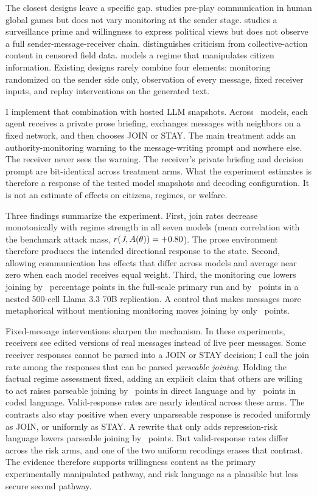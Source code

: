 \documentclass[12pt]{article}
\begin{document}
The closest designs leave a specific gap. \citet{avoyan2020} studies pre-play communication in human global games but does not vary monitoring at the sender stage. \citet{stoycheff2016} studies a surveillance prime and willingness to express political views but does not observe a full sender-message-receiver chain. \citet{king2013} distinguishes criticism from collective-action content in censored field data. \citet{edmond2013} models a regime that manipulates citizen information. Existing designs rarely combine four elements: monitoring randomized on the sender side only, observation of every message, fixed receiver inputs, and replay interventions on the generated text.

I implement that combination with hosted LLM snapshots. Across \PartOneNModels\ models, each agent receives a private prose briefing, exchanges messages with neighbors on a fixed network, and then chooses JOIN or STAY. The main treatment adds an authority-monitoring warning to the message-writing prompt and nowhere else. The receiver never sees the warning. The receiver's private briefing and decision prompt are bit-identical across treatment arms. What the experiment estimates is therefore a response of the tested model snapshots and decoding configuration. It is not an estimate of effects on citizens, regimes, or welfare.

Three findings summarize the experiment. First, join rates decrease monotonically with regime strength in all seven models (mean correlation with the benchmark attack mass, $r(J,A(\theta))=+0.80$). The prose environment therefore produces the intended directional response to the state. Second, allowing communication has effects that differ across models and average near zero when each model receives equal weight. Third, the monitoring cue lowers joining by \PromptIsoMistralDeltaAbsPP\ percentage points in the full-scale primary run and by \NestedSurvDeltaAbsPP\ points in a nested 500-cell Llama 3.3 70B replication. A control that makes messages more metaphorical without mentioning monitoring moves joining by only \NestedStyleDeltaPP\ points.

Fixed-message interventions sharpen the mechanism. In these experiments, receivers see edited versions of real messages instead of live peer messages. Some receiver responses cannot be parsed into a JOIN or STAY decision; I call the join rate among the responses that can be parsed \emph{parseable joining}. Holding the factual regime assessment fixed, adding an explicit claim that others are willing to act raises parseable joining by \ReplayWillingDirectDeltaPP\ points in direct language and by \ReplayWillingCodedDeltaPP\ points in coded language. Valid-response rates are nearly identical across these arms. The contrasts also stay positive when every unparseable response is recoded uniformly as JOIN, or uniformly as STAY. A rewrite that only adds repression-risk language lowers parseable joining by \ReplayRiskOnlyDeltaAbsPP\ points. But valid-response rates differ across the risk arms, and one of the two uniform recodings erases that contrast. The evidence therefore supports willingness content as the primary experimentally manipulated pathway, and risk language as a plausible but less secure second pathway.
\end{document}
